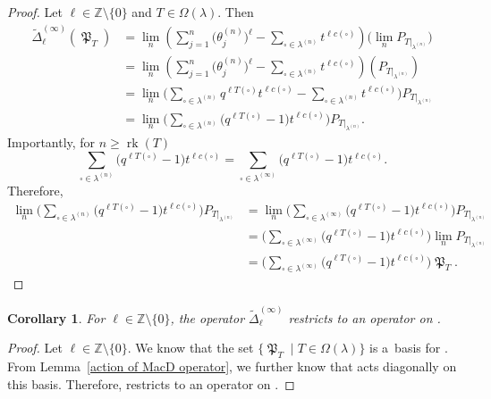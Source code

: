\documentclass[10pt,a4paper]{amsart}
\numberwithin{equation}{section}
\newtheorem{Corollary}[Theorem]{Corollary}
\theoremstyle{definition}
\DeclareMathOperator{\MacD}{\mathfrak{P}}
\DeclareMathOperator{\rk}{\mathrm{rk}}
\begin{document}
\begin{proof}
 Let $\ell \in \mathbb{Z}\setminus \{0\}$ and $T \in \Omega(\lambda)$. Then
 \begin{align*}
 \widetilde{\Delta}_{\ell}^{(\infty)}( \MacD_T) &= \lim_{n} \left(\sum_{j=1}^{n}\bigl(\theta^{(n)}_j\bigr)^{\ell} - \sum_{\square \in \lambda^{(n)}} t^{\ell c(\square)} \right) \bigl( \lim_{n} P_{T|_{\lambda^{(n)}}} \bigr) \\
 &= \lim_{n} \left(\sum_{j=1}^{n}\bigl(\theta^{(n)}_j\bigr)^{\ell} - \sum_{\square \in \lambda^{(n)}} t^{\ell c(\square)} \right) (P_{T|_{\lambda^{(n)}}}) \\
 &= \lim_{n} \biggl(\sum_{\square \in \lambda^{(n)}}q^{\ell T(\square)}t^{\ell c(\square)} -\sum_{\square \in \lambda^{(n)}}t^{\ell c(\square)} \biggr) P_{T|_{\lambda^{(n)}}} \\
 &= \lim_{n} \biggl(\sum_{\square \in \lambda^{(n)}} \bigl(q^{\ell T(\square)} -1\bigr)t^{\ell c(\square)} \biggr) P_{T|_{\lambda^{(n)}}}.
 \end{align*}
 Importantly, for $n \geq \rk(T)$
 \[
 \sum_{\square \in \lambda^{(n)}} \bigl(q^{\ell T(\square)} -1\bigr)t^{\ell c(\square)} = \sum_{\square \in \lambda^{(\infty)}} \bigl(q^{\ell T(\square)} -1\bigr)t^{\ell c(\square)}.
 \]
 Therefore,
 \begin{align*}
 \lim_{n} \biggl(\sum_{\square \in \lambda^{(n)}} \bigl(q^{\ell T(\square)} -1\bigr)t^{\ell c(\square)} \biggr) P_{T|_{\lambda^{(n)}}}&
 = \lim_{n} \biggl(\sum_{\square \in \lambda^{(\infty)}} \bigl(q^{\ell T(\square)} -1\bigr)t^{\ell c(\square)} \biggr) P_{T|_{\lambda^{(n)}}} \\
 & = \biggl(\sum_{\square \in \lambda^{(\infty)}} \bigl(q^{\ell T(\square)} -1\bigr)t^{\ell c(\square)} \biggr) \lim_{n} P_{T|_{\lambda^{(n)}}} \\
 & = \biggl(\sum_{\square \in \lambda^{(\infty)}} \bigl(q^{\ell T(\square)} -1\bigr)t^{\ell c(\square)} \biggr)\MacD_T. \tag*{\qed}
 \end{align*} \renewcommand{\qed}{}
\end{proof}

\begin{Corollary}
 For $\ell \in \mathbb{Z}\setminus \{0\}$, the operator $\widetilde{\Delta}_{\ell}^{(\infty)}$ restricts to an operator on .
\end{Corollary}

\begin{proof}
 Let $\ell \in \mathbb{Z} \setminus \{0\}$. We know that the set $\{ \MacD_{T} \mid T \in \Omega(\lambda)\}$ is a~basis for . From Lemma~\ref{action of MacD operator}, we further know that \smash{$\widetilde{\Delta}_{\ell}^{(\infty)}$} acts diagonally on this basis. Therefore, \smash{$\widetilde{\Delta}_{\ell}^{(\infty)}$} restricts to an operator on .
\end{proof}
\end{document}
